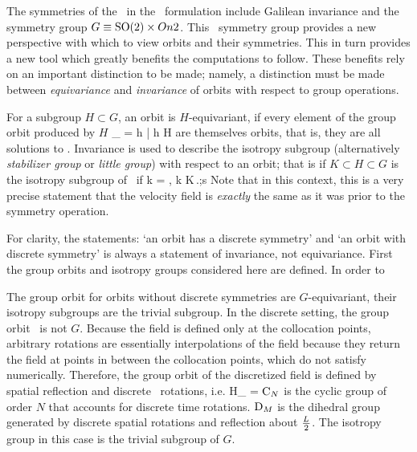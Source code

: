 The symmetries of the \KSe\ in the \spt\ formulation include Galilean invariance and the
symmetry group $G \equiv \textrm{SO}(2)\times On{2}$. This \spt\ symmetry group provides a new perspective with which
to view orbits and their symmetries. This in turn provides a new tool which greatly benefits the computations to follow.
These benefits rely on an important distinction to be made; namely, a distinction must be made between \textit{equivariance}
and \textit{invariance} of orbits with respect to group operations.

For a subgroup $H \subset G$, an orbit is $H$-equivariant, if every element of the group orbit produced by $H$
\beq
\Manif_{} = {h \cdot \orbit | h \in H}
\eeq
are themselves orbits, that is, they are all solutions to . Invariance is used to describe
the isotropy subgroup (alternatively \textit{stabilizer group} or \textit{little group})
with respect to an orbit; that is if $K \subset H \subset G$ is the isotropy subgroup of \utensor\ if
\beq
k \cdot \utensor = \utensor, \quad \forall k \in K\,.;s
Note that in this context, this is a very precise statement that the velocity field \dufield is \textit{exactly}
the same as it was prior to the symmetry operation.

For clarity, the statements: `an orbit has a discrete symmetry' and
`an orbit with discrete symmetry' is always a statement of invariance, not equivariance. First the group
orbits and isotropy groups considered here are defined. In order to


The group orbit for orbits without discrete symmetries are $G$-equivariant, their isotropy subgroups
are the trivial subgroup. In the discrete setting, the group orbit \dufield\ is not $G$. Because the field
is defined only at the collocation points, arbitrary rotations are essentially interpolations of the field
because they return the field at points in between the collocation points, which do not satisfy 
numerically. Therefore, the group orbit of the discretized field \dufield is defined by
spatial reflection and discrete \spt\ rotations, i.e.
\beq
H_{\orbit} =  \times {}
$\textrm{C}_{N}$ is the cyclic group of order $N$ that accounts for discrete time rotations. $\textrm{D}_{M}$ is the dihedral group
generated by discrete spatial rotations and reflection about $\frac{{L_{}}}{2}$. The isotropy group in this case
is the trivial subgroup of $G$.


